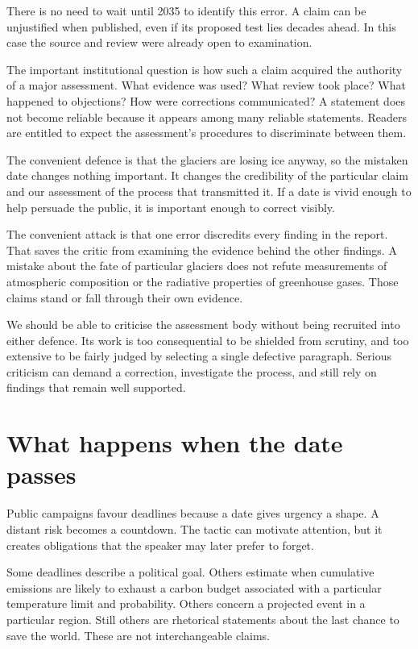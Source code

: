 \documentclass[12pt,a4paper]{book}
\begin{document}
There is no need to wait until 2035 to identify this error. A claim can be unjustified when published, even if its proposed test lies decades ahead. In this case the source and review were already open to examination.

The important institutional question is how such a claim acquired the authority of a major assessment. What evidence was used? What review took place? What happened to objections? How were corrections communicated? A statement does not become reliable because it appears among many reliable statements. Readers are entitled to expect the assessment's procedures to discriminate between them.

The convenient defence is that the glaciers are losing ice anyway, so the mistaken date changes nothing important. It changes the credibility of the particular claim and our assessment of the process that transmitted it. If a date is vivid enough to help persuade the public, it is important enough to correct visibly.

The convenient attack is that one error discredits every finding in the report. That saves the critic from examining the evidence behind the other findings. A mistake about the fate of particular glaciers does not refute measurements of atmospheric composition or the radiative properties of greenhouse gases. Those claims stand or fall through their own evidence.

We should be able to criticise the assessment body without being recruited into either defence. Its work is too consequential to be shielded from scrutiny, and too extensive to be fairly judged by selecting a single defective paragraph. Serious criticism can demand a correction, investigate the process, and still rely on findings that remain well supported.

\section*{What happens when the date passes}

Public campaigns favour deadlines because a date gives urgency a shape. A distant risk becomes a countdown. The tactic can motivate attention, but it creates obligations that the speaker may later prefer to forget.

Some deadlines describe a political goal. Others estimate when cumulative emissions are likely to exhaust a carbon budget associated with a particular temperature limit and probability. Others concern a projected event in a particular region. Still others are rhetorical statements about the last chance to save the world. These are not interchangeable claims.
\end{document}
